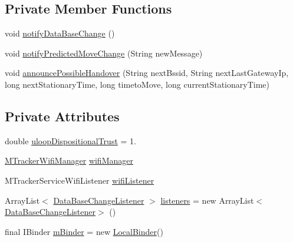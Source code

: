 \subsection*{Private Member Functions}
\begin{DoxyCompactItemize}
\item 
void \hyperlink{classeu_1_1uloop_1_1mobilitytracker_1_1MTrackerService_a3d1e08686bc3b88de0b5f5d777a31f5c}{notify\+Data\+Base\+Change} ()
\item 
void \hyperlink{classeu_1_1uloop_1_1mobilitytracker_1_1MTrackerService_abd897fb99831f3214a31ba4656b012c5}{notify\+Predicted\+Move\+Change} (String new\+Message)
\item 
void \hyperlink{classeu_1_1uloop_1_1mobilitytracker_1_1MTrackerService_a10277606556c2a61d4486184829be9d5}{announce\+Possible\+Handover} (String next\+Bssid, String next\+Last\+Gateway\+Ip, long next\+Stationary\+Time, long timeto\+Move, long current\+Stationary\+Time)
\end{DoxyCompactItemize}
\subsection*{Private Attributes}
\begin{DoxyCompactItemize}
\item 
double \hyperlink{classeu_1_1uloop_1_1mobilitytracker_1_1MTrackerService_aefb00b5f991cff950571c5f672887fc9}{uloop\+Dispositional\+Trust} = 1.
\item 
\hyperlink{classeu_1_1uloop_1_1mobilitytracker_1_1MTrackerWifiManager}{M\+Tracker\+Wifi\+Manager} \hyperlink{classeu_1_1uloop_1_1mobilitytracker_1_1MTrackerService_aecb42f35385576caa82ce620bf9cd18f}{wifi\+Manager}
\item 
M\+Tracker\+Service\+Wifi\+Listener \hyperlink{classeu_1_1uloop_1_1mobilitytracker_1_1MTrackerService_a753348851dbd47cb52c5b3e22c2528fe}{wifi\+Listener}
\item 
Array\+List$<$ \hyperlink{interfaceeu_1_1uloop_1_1mobilitytracker_1_1DataBaseChangeListener}{Data\+Base\+Change\+Listener} $>$ \hyperlink{classeu_1_1uloop_1_1mobilitytracker_1_1MTrackerService_a204aaa3e3f75b5783a0a4e4c49b8842e}{listeners} = new Array\+List$<$\hyperlink{interfaceeu_1_1uloop_1_1mobilitytracker_1_1DataBaseChangeListener}{Data\+Base\+Change\+Listener}$>$ ()
\item 
final I\+Binder \hyperlink{classeu_1_1uloop_1_1mobilitytracker_1_1MTrackerService_a7d8d344f0b2cfe0ebb5ab619dfdbecbb}{m\+Binder} = new \hyperlink{classeu_1_1uloop_1_1mobilitytracker_1_1MTrackerService_1_1LocalBinder}{Local\+Binder}()
\end{DoxyCompactItemize}


